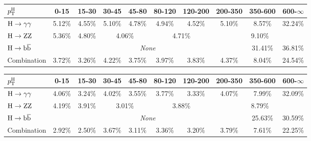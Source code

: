 \begin{table}[htb]
\centering
{}
\label{tab:proj_pth_unc_scen2}
\begin{tabular}{|l|c|c|c|c|c|c|c|c|c|}
\hline
$p_\mathrm{T}^\mathrm{H}$       & 0-15    &  15-30   &  30-45    &  45-80   &  80-120  &  120-200  &  200-350  &  350-600  &  600-$\infty$  \\
\hline
$\mathrm{H}\to\mathrm{\gamma}\mathrm{\gamma}$       &  5.12\%  &   4.55\%  &  5.10\%   &   4.78\%   &   4.94\%   &   4.52\%   &  5.10\%   &  8.57\%   &   32.24\%    \\
\hline
$\mathrm{H}\to\mathrm{Z}\mathrm{Z}$       &  5.36\%  &   4.80\%  &  \multicolumn{2}{c|}{4.06\%}   &   \multicolumn{2}{c|}{4.71\%}   &   \multicolumn{3}{c|}{9.10\%}  \\
\hline
$\mathrm{H}\to\mathrm{b}\overline{\mathrm{b}}$       &  \multicolumn{7}{c|}{\textit{None}}                                                             &  31.41\%  &   36.81\%    \\
\hline
Combination  &  3.72\%  &   3.26\%  &  4.22\%   &   3.75\%   &   3.97\%   &   3.83\%   &  4.37\%   &  8.04\%   &   24.54\%    \\
\hline
\end{tabular}
\end{table}


\begin{table}[ht]
\centering
{}
\label{tab:proj_pth_unc_statonly}
\begin{tabular}{|l|c|c|c|c|c|c|c|c|c|}
\hline
$p_\mathrm{T}^\mathrm{H}$       & 0-15    &  15-30   &  30-45    &  45-80   &  80-120  &  120-200  &  200-350  &  350-600  &  600-$\infty$  \\
\hline
$\mathrm{H}\to\mathrm{\gamma}\mathrm{\gamma}$       &  4.06\%  &  3.24\%  &  4.02\%  &  3.55\%  &  3.77\%  &  3.33\%   &  4.07\%  &  7.99\%   &  32.09\%    \\
\hline
$\mathrm{H}\to\mathrm{Z}\mathrm{Z}$       &  4.19\%  &  3.91\%  &  \multicolumn{2}{c|}{3.01\%}  &  \multicolumn{2}{c|}{3.88\%} &  \multicolumn{3}{c|}{8.79\%}  \\
\hline
$\mathrm{H}\to\mathrm{b}\overline{\mathrm{b}}$       &  \multicolumn{7}{c|}{\textit{None}}                                                   &  25.63\%  &  30.59\%    \\
\hline
Combination  &  2.92\%  &  2.50\%  &  3.67\%  &  3.11\%  &  3.36\%  &  3.20\%   &  3.79\%  &  7.61\%   &  22.25\%    \\
\hline
\end{tabular}
\end{table}


